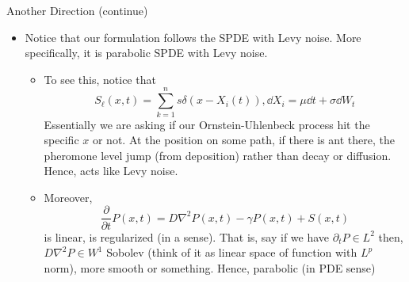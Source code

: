 \documentclass[10pt]{beamer}
\begin{document}
    \begin{frame}{Another Direction (continue)}
    \begin{itemize}
    \item Notice that our formulation follows the SPDE with Levy noise. More specifically, it is parabolic SPDE with Levy noise.
    \begin{itemize}
        \item To see this, notice that
        \[
        S_\ell(x,t) = \sum_{k=1}^n s\delta(x-X_i(t)), \dd X_i = \mu \dd t + \sigma \dd W_t 
        \]
        Essentially we are asking if our Ornstein-Uhlenbeck process hit the specific $x$ or not. At the position on some path, if there is ant there, the pheromone level jump (from deposition) rather than decay or diffusion. Hence, acts like Levy noise.
        \item Moreover,
        \[
        \dfrac{\partial}{\partial t}P(x,t) = D\nabla^2P(x,t) - \gamma P(x,t) + S(x,t)
        \]
        is linear, is regularized (in a sense). That is, say if we have $\partial_tP \in L^2$ then, $D\nabla^2P \in W^1$ Sobolev (think of it as linear space of function with $L^p$ norm), more smooth or something. Hence, parabolic (in PDE sense)
    \end{itemize}
    \end{itemize}
    \end{frame}
\end{document}

